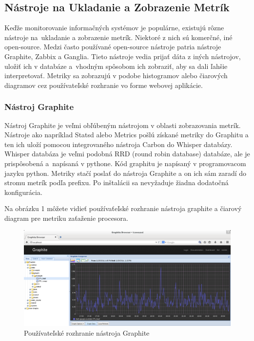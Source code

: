\documentclass[a4paper, usesections, upjsfrontpage, disablespecwarning, thesismargins, thesislinespacing]{rnthesissvk}
\begin{document}
\subsection{Nástroje na Ukladanie a Zobrazenie Metrík}

Keďže monitorovanie informačných systémov je populárne, existujú rôzne nástroje na~ukladanie a zobrazenie metrík.
Niektoré z nich sú komerčné, iné open-source.
Medzi často používané open-source nástroje patria nástroje Graphite, Zabbix a Ganglia.
Tieto nástroje vedia prijať dáta z iných nástrojov, uložiť ich v databáze a~vhodným spôsobom ich zobraziť, aby sa dali ľahšie interpretovať.
Metriky sa zobrazujú v podobe histogramov alebo čiarových diagramov cez používateľské rozhranie vo forme webovej aplikácie.

\subsubsection{Nástroj Graphite}

\noindent
Nástroj Graphite je veľmi obľúbeným nástrojom v oblasti zobrazovania metrík.
Nástroje ako napríklad Statsd alebo Metrics pošlú získané metriky do Graphitu a ten ich uloží pomocou integrovaného nástroja Carbon do Whisper databázy. 
Whisper databáza je veľmi podobná RRD (round robin database) databáze, ale je prispôsobená a~napísaná v pythone.
Kód graphitu je napísaný v programovacom jazyku python.
Metriky stačí poslať do nástroja Graphite a on ich sám zaradí do stromu metrík podľa prefixu.
Po inštalácii sa nevyžaduje žiadna dodatočná konfigurácia.

Na obrázku 1 môžete vidieť používaťeľské rozhranie nástroja graphite a čiarový diagram pre metriku zaťaženie procesora.

\begin{figure}
\begin{center}
\includegraphics[scale=0.41]{graphite1.png}
\caption{Používateľské rozhranie nástroja Graphite}
\end{center}
\end{figure}
\end{document}
